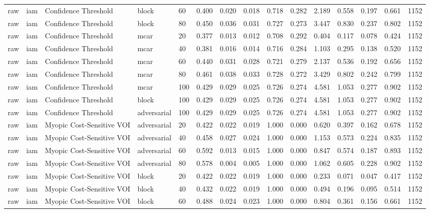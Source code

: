 \begin{table}[!ht]
{\begin{tabular}{lllllllllllllll}
raw & iam & Confidence Threshold & block & 60 & 0.400 & 0.020 & 0.018 & 0.718 & 0.282 & 2.189 & 0.558 & 0.197 & 0.661 & 1152 \\
raw & iam & Confidence Threshold & block & 80 & 0.450 & 0.036 & 0.031 & 0.727 & 0.273 & 3.447 & 0.830 & 0.237 & 0.802 & 1152 \\
raw & iam & Confidence Threshold & mcar & 20 & 0.377 & 0.013 & 0.012 & 0.708 & 0.292 & 0.404 & 0.117 & 0.078 & 0.424 & 1152 \\
raw & iam & Confidence Threshold & mcar & 40 & 0.381 & 0.016 & 0.014 & 0.716 & 0.284 & 1.103 & 0.295 & 0.138 & 0.520 & 1152 \\
raw & iam & Confidence Threshold & mcar & 60 & 0.440 & 0.031 & 0.028 & 0.721 & 0.279 & 2.137 & 0.536 & 0.192 & 0.656 & 1152 \\
raw & iam & Confidence Threshold & mcar & 80 & 0.461 & 0.038 & 0.033 & 0.728 & 0.272 & 3.429 & 0.802 & 0.242 & 0.799 & 1152 \\
raw & iam & Confidence Threshold & mcar & 100 & 0.429 & 0.029 & 0.025 & 0.726 & 0.274 & 4.581 & 1.053 & 0.277 & 0.902 & 1152 \\
raw & iam & Confidence Threshold & block & 100 & 0.429 & 0.029 & 0.025 & 0.726 & 0.274 & 4.581 & 1.053 & 0.277 & 0.902 & 1152 \\
raw & iam & Confidence Threshold & adversarial & 100 & 0.429 & 0.029 & 0.025 & 0.726 & 0.274 & 4.581 & 1.053 & 0.277 & 0.902 & 1152 \\
raw & iam & Myopic Cost-Sensitive VOI & adversarial & 20 & 0.422 & 0.022 & 0.019 & 1.000 & 0.000 & 0.620 & 0.397 & 0.162 & 0.678 & 1152 \\
raw & iam & Myopic Cost-Sensitive VOI & adversarial & 40 & 0.458 & 0.027 & 0.024 & 1.000 & 0.000 & 1.153 & 0.573 & 0.224 & 0.835 & 1152 \\
raw & iam & Myopic Cost-Sensitive VOI & adversarial & 60 & 0.592 & 0.013 & 0.015 & 1.000 & 0.000 & 0.847 & 0.574 & 0.187 & 0.893 & 1152 \\
raw & iam & Myopic Cost-Sensitive VOI & adversarial & 80 & 0.578 & 0.004 & 0.005 & 1.000 & 0.000 & 1.062 & 0.605 & 0.228 & 0.902 & 1152 \\
raw & iam & Myopic Cost-Sensitive VOI & block & 20 & 0.422 & 0.022 & 0.019 & 1.000 & 0.000 & 0.233 & 0.071 & 0.047 & 0.417 & 1152 \\
raw & iam & Myopic Cost-Sensitive VOI & block & 40 & 0.432 & 0.022 & 0.019 & 1.000 & 0.000 & 0.494 & 0.196 & 0.095 & 0.514 & 1152 \\
raw & iam & Myopic Cost-Sensitive VOI & block & 60 & 0.488 & 0.024 & 0.023 & 1.000 & 0.000 & 0.804 & 0.361 & 0.156 & 0.661 & 1152 \\

\end{tabular}}
\end{table}
